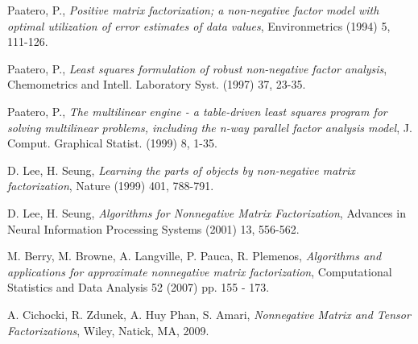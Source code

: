 \documentclass[final,leqno,onefignum,onetabnum]{siamltex1213}
\begin{document}
\begin{thebibliography}{1}

 {\sc Paatero, P.},
{\em Positive matrix factorization; a non-negative factor model with optimal utilization of error estimates of data values}, Environmetrics (1994) 5, 111-126.

 {\sc Paatero, P.},
{\em Least squares formulation of robust non-negative factor analysis}, Chemometrics and Intell. Laboratory Syst. (1997) 37, 23-35.

 {\sc Paatero, P.},
{\em The multilinear engine - a table-driven least squares program for solving multilinear problems, including the n-way parallel factor analysis model}, J. Comput. Graphical Statist. (1999) 8, 1-35.

 {\sc D. Lee, H. Seung},
{\em Learning the parts of objects by non-negative matrix factorization}, Nature (1999) 401, 788-791.

 {\sc D. Lee, H. Seung},
{\em Algorithms for Nonnegative Matrix Factorization}, Advances in Neural Information Processing Systems (2001) 13, 556-562.

 {\sc M. Berry, M. Browne, A. Langville, P. Pauca, R. Plemenos},
{\em Algorithms and applications for approximate nonnegative matrix factorization}, Computational Statistics and Data Analysis 52 (2007) pp. 155 - 173.

 {\sc A. Cichocki, R. Zdunek, A. Huy Phan, S. Amari}, {\em Nonnegative Matrix and Tensor Factorizations}, Wiley, Natick, MA, 2009.

\end{thebibliography}
\end{document}
